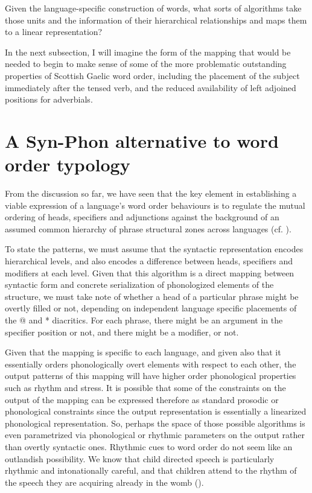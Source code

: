 \documentclass[output=paper,colorlinks,citecolor=brown]{langscibook}
\begin{document}
Given the language-specific construction of words, what sorts of algorithms take those units and the information of their hierarchical relationships and maps them to a linear representation? 

In the next subsection, I will imagine the form of the mapping that would be needed to begin to make sense of some of the more problematic outstanding properties of Scottish Gaelic word order, including the placement of the subject immediately after the tensed verb, and the reduced availability of left adjoined positions for adverbials. 

\section{A Syn-Phon alternative to word order typology}\label{sec:ramchand:6}
From the discussion so far, we have seen that the key element in establishing a viable expression of a language's word order behaviours is to regulate the mutual ordering of heads, specifiers and adjunctions against the background of an assumed common hierarchy of phrase structural zones across languages (cf. \citealt{ramchandsvenonius14}). 

To state the patterns, we must assume that the syntactic representation encodes hierarchical levels, and also encodes a difference between heads, specifiers and modifiers at each level. Given that this algorithm is a direct mapping between syntactic form and concrete serialization of phonologized elements of the structure, we must take note of whether a head of a particular phrase might be overtly filled or not, depending on independent language specific placements of the @ and {*} diacritics. For each phrase, there might be an argument in the specifier position or not, and there might be a modifier, or not. 

Given that the mapping is specific to each language, and given also that it essentially orders phonologically overt elements with respect to each other, the output patterns of this mapping will have higher order phonological properties such as rhythm and stress. It is possible that some of the constraints on the output of the mapping can be expressed therefore as standard prosodic or phonological constraints since the output representation is essentially a linearized phonological representation. So, perhaps the space of those possible algorithms is even parametrized via phonological or rhythmic parameters on the output rather than overtly syntactic ones. Rhythmic cues to word order do not seem like an outlandish possibility. We know that child directed speech is particularly rhythmic and intonationally careful, and that children attend to the rhythm of the speech they are acquiring already in the womb (\citealt{nesporvogel86}). 
\end{document}
